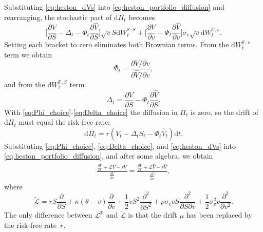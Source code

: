 \documentclass[12pt]{report} %
\theoremstyle{plain} %
\theoremstyle{definition} %
\theoremstyle{remark} %
\begin{document}
Substituting \eqref{eq:heston_dVs} into \eqref{eq:heston_portfolio_diffusion} and rearranging,
the stochastic part of $\mathrm d\Pi_t$ becomes
\[
\bigl[\frac{\partial V}{\partial S}-\Delta_t-\Phi_t \frac{\partial \widehat V}{\partial S}\bigr]\sqrt{v}S\mathrm dW_t^{\mathbb P,S}
+
\bigl[\frac{\partial V}{\partial v}-\Phi_t \frac{\partial \widehat V}{\partial v}\bigr]\sigma_v\sqrt{v}\mathrm dW_t^{\mathbb P,v}.
\]
Setting each bracket to zero eliminates both Brownian terms. From the $\mathrm dW_t^{\mathbb P,v}$
term we obtain
\begin{equation}\label{eq:Phi_choice}
\Phi_t = \frac{\partial V/\partial v}{\partial \widehat V/\partial v},
\end{equation}
and from the $\mathrm dW_t^{\mathbb P,S}$ term
\begin{equation}\label{eq:Delta_choice}
\Delta_t = \frac{\partial V}{\partial S} - \Phi_t \frac{\partial \widehat V}{\partial S}.
\end{equation}
With \eqref{eq:Phi_choice}-\eqref{eq:Delta_choice} the diffusion in $\Pi_t$ is zero, so the drift
of $\mathrm d\Pi_t$ must equal the risk-free rate:
\begin{equation}\label{eq:heston_riskfree_portfolio}
	\mathrm d\Pi_t = r(V_t - \Delta_t S_t - \Phi_t \widehat V_t )\mathrm d t.
\end{equation}
Substituting \eqref{eq:Phi_choice}, \eqref{eq:Delta_choice}, and \eqref{eq:heston_dVs} into
\eqref{eq:heston_portfolio_diffusion}, and after some algebra, we obtain
\begin{equation}\label{eq:market_price_vol}
\begin{aligned}
 \frac{\frac{\partial V}{\partial t} + \tilde{\mathcal L} V - rV }{\frac{\partial V}{ \partial v}}
 = \frac{\frac{\partial \widehat V}{\partial t} + \tilde{\mathcal L} \widehat V - r \widehat V}{\frac{\partial \widehat V}{\partial v}},
\end{aligned}
\end{equation}
where
\[
\tilde{\mathcal L} = r S\frac{\partial}{\partial S}
 + \kappa(\theta - v)\frac{\partial}{\partial v}
 + \frac{1}{2} v S^{2}\frac{\partial^{2}}{\partial S^{2}}
 + \rho\sigma_v v S\frac{\partial^{2}}{\partial S\partial v}
 + \frac{1}{2}\sigma_v^{2} v \frac{\partial^{2}}{\partial v^{2}}.
\]
The only difference between $\mathcal L^{\mathbb P}$ and $\tilde{\mathcal L}$ is that the drift
$\mu$ has been replaced by the risk-free rate~$r$.
\end{document}
